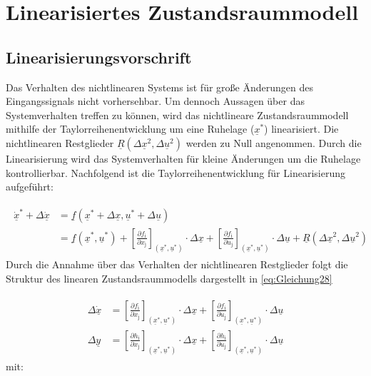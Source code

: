 \section{Linearisiertes Zustandsraummodell}

\subsection{Linearisierungsvorschrift}

Das Verhalten des nichtlinearen Systems ist für große Änderungen des Eingangssignals nicht vorhersehbar. Um dennoch Aussagen über das Systemverhalten treffen zu können, wird das nichtlineare Zustandsraummodell mithilfe der Taylorreihenentwicklung um eine Ruhelage ($\underline{x}^{*}$) linearisiert. Die nichtlinearen Restglieder $\underline{R}(\Delta{\underline{x}^2}, \Delta{\underline{u}^2})$ werden zu Null angenommen. Durch die Linearisierung wird das Systemverhalten für kleine Änderungen um die Ruhelage kontrollierbar. Nachfolgend ist die Taylorreihenentwicklung für Linearisierung aufgeführt:

\begin{align} \label{eq:Gleichung27}
    \begin{split}
        \dot{\underline{x}}^{*}+\Delta{\dot{\underline{x}}} &=\underline{f}(\underline{x}^{*}+\Delta{\underline{x}},\underline{u}^{*}+\Delta{\underline{u}})\\
        &=\underline{f}(\underline{x}^{*},\underline{u}^{*})+\left[\frac{\partial f_{\mathrm{i}}}{\partial x_{\mathrm{j}}}\right]_{(\underline{x}^{*}, \underline{u}^{*})}\cdot\Delta{\underline{x}}+\left[\frac{\partial f_{\mathrm{i}}}{\partial u_{\mathrm{j}}}\right]_{(\underline{x}^{*},\underline{u}^{*})}\cdot\Delta{\underline{u}}+\underline{R}(\Delta{\underline{x}^2}, \Delta{\underline{u}^2})
    \end{split}
\end{align}
\newline
Durch die Annahme über das Verhalten der nichtlinearen Restglieder folgt die Struktur des linearen Zustandsraummodells dargestellt in \autoref{eq:Gleichung28}

\begin{align} \label{eq:Gleichung28}
    \begin{split}
        \Delta\dot{\underline{x}} &= \left[\frac{\partial f_{\mathrm{i}}}{\partial x_{\mathrm{j}}}\right]_{(\underline{x}^{*}, \underline{u}^{*})}\cdot\Delta{\underline{x}}+\left[\frac{\partial f_{\mathrm{i}}}{\partial u_{\mathrm{j}}}\right]_{(\underline{x}^{*},\underline{u}^{*})}\cdot\Delta{\underline{u}}\\   
        \Delta{\underline{y}} &= \left[\frac{\partial h_{\mathrm{i}}}{\partial x_{\mathrm{j}}}\right]_{(\underline{x}^{*}, \underline{u}^{*})}\cdot\Delta{\underline{x}}+\left[\frac{\partial h_{\mathrm{i}}}{\partial u_{\mathrm{j}}}\right]_{(\underline{x}^{*},\underline{u}^{*})}\cdot\Delta{\underline{u}}
    \end{split}
\end{align}
\newline
mit:

